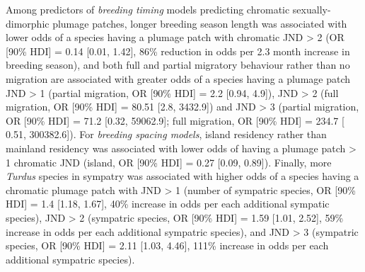 \documentclass[
  a4paper,
]{article}
\begin{document}
Among predictors of \emph{breeding timing} models predicting chromatic
sexually-dimorphic plumage patches, longer breeding season length was
associated with lower odds of a species having a plumage patch with
chromatic JND \textgreater{} 2 (OR {[}90\% HDI{]} = 0.14 {[}0.01,
1.42{]}, 86\% reduction in odds per 2.3 month increase in breeding
season), and both full and partial migratory behaviour rather than no
migration are associated with greater odds of a species having a plumage
patch JND \textgreater{} 1 (partial migration, OR {[}90\% HDI{]} = 2.2
{[}0.94, 4.9{]}), JND \textgreater{} 2 (full migration, OR {[}90\%
HDI{]} = 80.51 {[}2.8, 3432.9{]}) and JND \textgreater{} 3 (partial
migration, OR {[}90\% HDI{]} = 71.2 {[}0.32, 59062.9{]}; full migration,
OR {[}90\% HDI{]} = 234.7 {[} 0.51, 300382.6{]}). For \emph{breeding
spacing models}, island residency rather than mainland residency was
associated with lower odds of having a plumage patch \textgreater{} 1
chromatic JND (island, OR {[}90\% HDI{]} = 0.27 {[}0.09, 0.89{]}).
Finally, more \emph{Turdus} species in sympatry was associated with
higher odds of a species having a chromatic plumage patch with JND
\textgreater{} 1 (number of sympatric species, OR {[}90\% HDI{]} = 1.4
{[}1.18, 1.67{]}, 40\% increase in odds per each additional sympatic
species), JND \textgreater{} 2 (sympatric species, OR {[}90\% HDI{]} =
1.59 {[}1.01, 2.52{]}, 59\% increase in odds per each additional
sympatric species), and JND \textgreater{} 3 (sympatric species, OR
{[}90\% HDI{]} = 2.11 {[}1.03, 4.46{]}, 111\% increase in odds per each
additional sympatric species).
\end{document}
